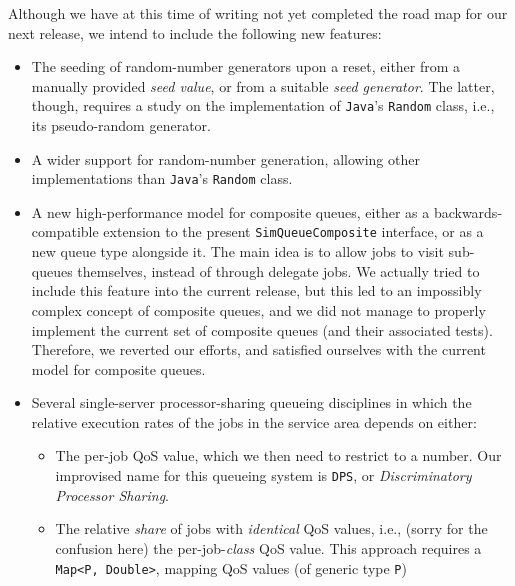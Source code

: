 Although we have at this time of writing not yet
  completed the road map for our next release,
  we intend to include the following new features:
\begin{itemize}
  \item The seeding of random-number generators
          upon a reset,
          either from a manually provided
          {\em seed value\/},
          or from a suitable {\em seed generator}.
        The latter, though, requires a study
          on the implementation of
          \lstinline|Java|'s \lstinline|Random|
          class,
          i.e.,
          its pseudo-random generator.
  \item A wider support for random-number generation,
          allowing other implementations than
          \lstinline|Java|'s \lstinline|Random| class.
  \item A new high-performance model
          for composite queues,
          either as a backwards-compatible
          extension to the present \lstinline|SimQueueComposite| interface,
          or as a new queue type alongside it.
        The main idea is to allow jobs to
          visit sub-queues themselves,
          instead of through delegate jobs.
        We actually tried to include this
          feature into the current release,
          but this led to an impossibly complex
          concept of composite queues,
          and we did not manage to properly
          implement the current set of
          composite queues (and their associated tests).
        Therefore, we reverted our efforts,
          and satisfied ourselves with the current
          model for composite queues.
  \item Several single-server processor-sharing queueing disciplines
          in which the relative execution rates of the jobs in the
          service area depends on either:
          \begin{itemize}
            \item The per-job QoS value, which we then need to restrict to a number.
                  Our improvised name for this queueing system is
                    \lstinline|DPS|, or {\em Discriminatory Processor Sharing}.
            \item The relative {\em share\/} of jobs with {\em identical\/}
                    QoS values, i.e., (sorry for the confusion here) the per-job-{\em class\/}
                    QoS value.
                  This approach requires a \lstinline|Map<P, Double>|,
                    mapping QoS values (of generic type \lstinline|P|)

\end{itemize}
\end{itemize}
